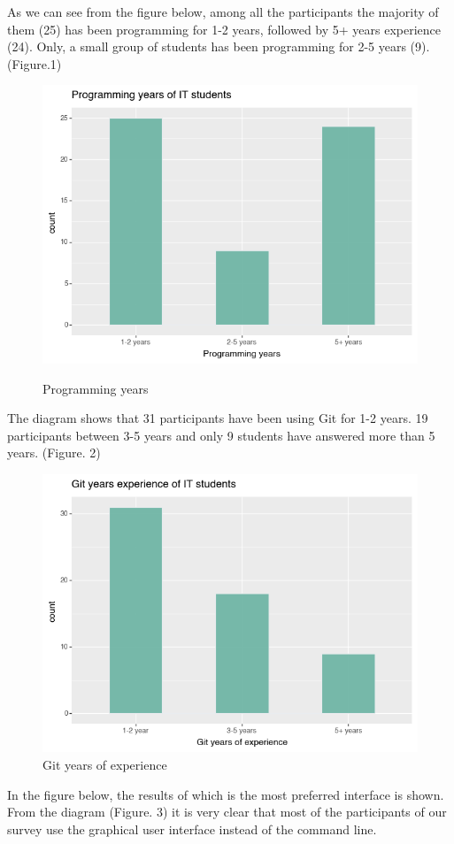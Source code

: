 \documentclass[]{report}
\begin{document}
	As we can see from the figure below, among all the participants the majority of them (25) has been programming for 1-2 years, followed by 5+ years experience (24). Only, a small group of students has been programming for 2-5 years (9). (Figure.1)
	
	\begin{figure}[H]
		\centering
		\includegraphics[width=0.75\linewidth]{ProgrammingYears}\\
		\caption{Programming years}
		\label{fig:  1}
	\end{figure}
	
		The diagram shows that 31 participants have been using Git for 1-2 years. 19 participants between 3-5 years and only 9 students have answered more than 5 years. (Figure. 2)
	\begin{figure}[H]
		\centering
		\includegraphics[width=0.75\linewidth]{GitYearsExperience}
		\caption{Git years of experience}
		\label{fig: 2}
	\end{figure}
	
	In the figure below, the results of which is the most preferred interface is shown. From the diagram (Figure. 3) it is very clear that most of the participants of our survey use the graphical user interface instead of the command line.
	
\end{document}
